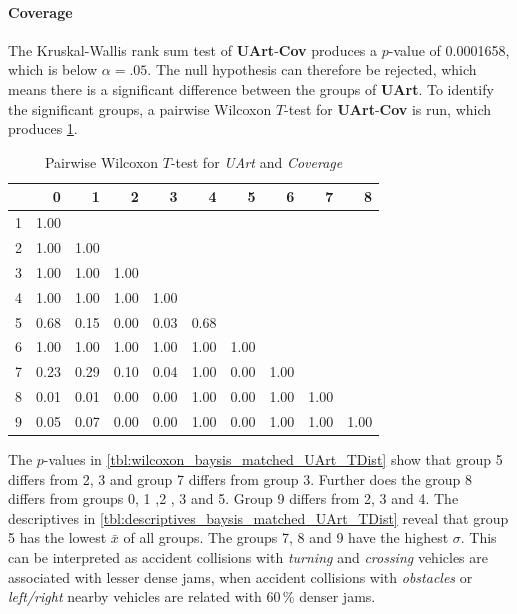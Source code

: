 \paragraph{Coverage}
The Kruskal-Wallis rank sum test of \textbf{UArt}-\textbf{Cov} produces a $p$-value of 0.0001658, which is below $\alpha=.05$. The null hypothesis can therefore be rejected, which means there is a significant difference between the groups of \textbf{UArt}. To identify the significant groups, a pairwise Wilcoxon $T$-test for \textbf{UArt}-\textbf{Cov} is run, which produces \cref{tbl:wilcoxon_baysis_matched_UArt_Cov}.
\begin{table}[ht]
	\small
	\centering
	\begin{tabular}{rrrrrrrrrr}
		\toprule
		& 0 & 1 & 2 & 3 & 4 & 5 & 6 & 7 & 8 \\ 
		\midrule
		1 & 1.00 &  &  &  &  &  &  &  &  \\ 
		2 & 1.00 & 1.00 &  &  &  &  &  &  &  \\ 
		3 & 1.00 & 1.00 & 1.00 &  &  &  &  &  &  \\ 
		4 & 1.00 & 1.00 & 1.00 & 1.00 &  &  &  &  &  \\ 
		5 & 0.68 & 0.15 & 0.00 & 0.03 & 0.68 &  &  &  &  \\ 
		6 & 1.00 & 1.00 & 1.00 & 1.00 & 1.00 & 1.00 &  &  &  \\ 
		7 & 0.23 & 0.29 & 0.10 & 0.04 & 1.00 & 0.00 & 1.00 &  &  \\ 
		8 & 0.01 & 0.01 & 0.00 & 0.00 & 1.00 & 0.00 & 1.00 & 1.00 &  \\ 
		9 & 0.05 & 0.07 & 0.00 & 0.00 & 1.00 & 0.00 & 1.00 & 1.00 & 1.00 \\ 
		\bottomrule
	\end{tabular}
	\caption{Pairwise Wilcoxon $T$-test for \textit{UArt} and \textit{Coverage}}
	\label{tbl:wilcoxon_baysis_matched_UArt_Cov}
\end{table}
The $p$-values in \cref{tbl:wilcoxon_baysis_matched_UArt_TDist} show that group 5 differs from 2, 3 and group 7 differs from group 3. Further does the group 8 differs from groups 0, 1 ,2 , 3 and 5. Group 9 differs from 2, 3 and 4. The descriptives in \cref{tbl:descriptives_baysis_matched_UArt_TDist} reveal that group 5 has the lowest $\bar{x}$ of all groups. The groups 7, 8 and 9 have the highest $\sigma$. This can be interpreted as accident collisions with \textit{turning} and \textit{crossing} vehicles are associated with lesser dense jams, when accident collisions with \textit{obstacles} or \textit{left/right} nearby vehicles are related with 60\,\% denser jams.
